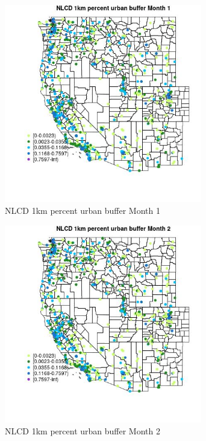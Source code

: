 \begin{figure} 
\centering  
\includegraphics[width=0.77\textwidth]{Code_Outputs/Report_ML_input_PM25_Step4_part_f_de_duplicated_aves_prioritize_24hr_obswNAs_MapObsMo1NLCD_1km_percent_urban_buffer.jpg} 
\caption{\label{fig:Report_ML_input_PM25_Step4_part_f_de_duplicated_aves_prioritize_24hr_obswNAsMapObsMo1NLCD_1km_percent_urban_buffer}NLCD 1km percent urban buffer Month 1} 
\end{figure} 
 

\begin{figure} 
\centering  
\includegraphics[width=0.77\textwidth]{Code_Outputs/Report_ML_input_PM25_Step4_part_f_de_duplicated_aves_prioritize_24hr_obswNAs_MapObsMo2NLCD_1km_percent_urban_buffer.jpg} 
\caption{\label{fig:Report_ML_input_PM25_Step4_part_f_de_duplicated_aves_prioritize_24hr_obswNAsMapObsMo2NLCD_1km_percent_urban_buffer}NLCD 1km percent urban buffer Month 2} 
\end{figure} 
 

